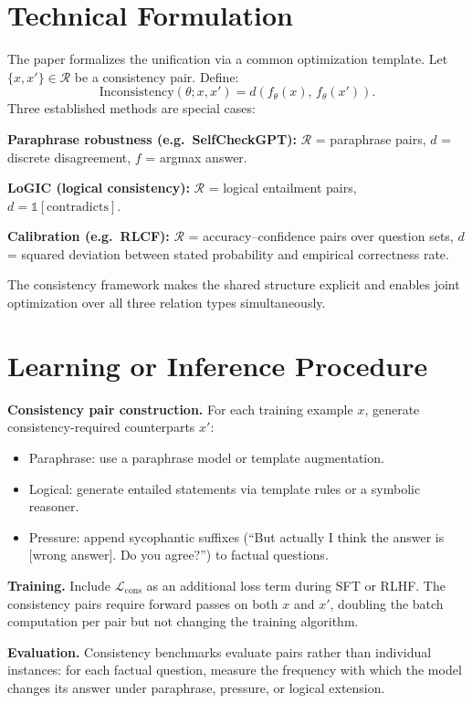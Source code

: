 \documentclass[10pt,twocolumn]{article}
\begin{document}
\section{Technical Formulation}

The paper formalizes the unification via a common optimization template. Let
$\{x, x'\} \in \mathcal{R}$ be a consistency pair. Define:
\[
\mathrm{Inconsistency}(\theta; x, x') = d(f_\theta(x),\, f_\theta(x')).
\]
Three established methods are special cases:

\textbf{Paraphrase robustness (e.g.\ SelfCheckGPT):}
$\mathcal{R}$ = paraphrase pairs, $d$ = discrete disagreement, $f$ = argmax answer.

\textbf{LoGIC (logical consistency):}
$\mathcal{R}$ = logical entailment pairs, $d = \mathbb{1}[\mathrm{contradicts}]$.

\textbf{Calibration (e.g.\ RLCF):}
$\mathcal{R}$ = accuracy--confidence pairs over question sets,
$d$ = squared deviation between stated probability and empirical correctness rate.

The consistency framework makes the shared structure explicit and enables
joint optimization over all three relation types simultaneously.

\section{Learning or Inference Procedure}

\textbf{Consistency pair construction.} For each training example $x$, generate
consistency-required counterparts $x'$:
\begin{itemize}[itemsep=2pt,parsep=0pt]
  \item Paraphrase: use a paraphrase model or template augmentation.
  \item Logical: generate entailed statements via template rules or a symbolic reasoner.
  \item Pressure: append sycophantic suffixes (``But actually I think the answer
    is [wrong answer]. Do you agree?'') to factual questions.
\end{itemize}

\textbf{Training.} Include $\mathcal{L}_{\mathrm{cons}}$ as an additional loss term
during SFT or RLHF. The consistency pairs require forward passes on both $x$ and $x'$,
doubling the batch computation per pair but not changing the training algorithm.

\textbf{Evaluation.} Consistency benchmarks evaluate pairs rather than individual
instances: for each factual question, measure the frequency with which the model
changes its answer under paraphrase, pressure, or logical extension.
\end{document}
